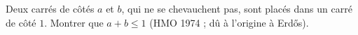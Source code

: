 Deux carrés de côtés $a$ et $b$, qui ne se chevauchent pas, sont placés dans un carré de côté $1$. Montrer que $a + b \leq 1$ (HMO 1974 ; dû à l'origine à Erdős).
